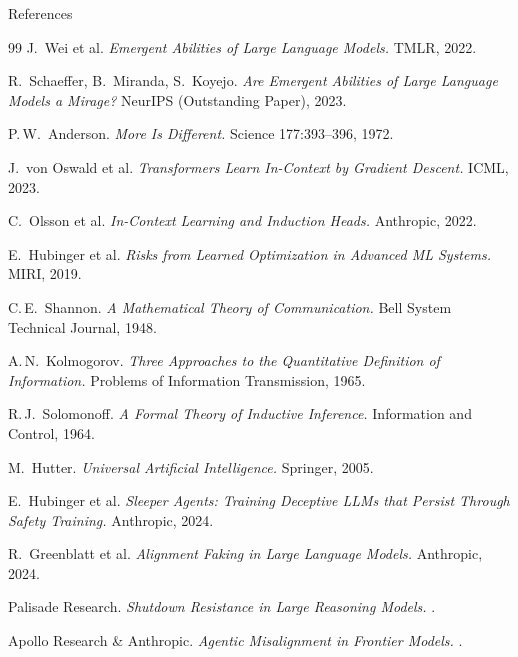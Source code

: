 \documentclass[aspectratio=169, 12pt, xcolor={dvipsnames,table}]{beamer}
\begin{document}
\appendix
\begin{frame}[allowframebreaks]{References}
  \footnotesize
  \begin{thebibliography}{99}
    J.\ Wei et al.
    \newblock \emph{Emergent Abilities of Large Language Models.}
    \newblock TMLR, 2022.

    R.\ Schaeffer, B.\ Miranda, S.\ Koyejo.
    \newblock \emph{Are Emergent Abilities of Large Language Models a Mirage?}
    \newblock NeurIPS (Outstanding Paper), 2023.

    P.\,W.\ Anderson.
    \newblock \emph{More Is Different.}
    \newblock Science 177:393--396, 1972.

    J.\ von Oswald et al.
    \newblock \emph{Transformers Learn In-Context by Gradient Descent.}
    \newblock ICML, 2023.

    C.\ Olsson et al.
    \newblock \emph{In-Context Learning and Induction Heads.}
    \newblock Anthropic, 2022.

    E.\ Hubinger et al.
    \newblock \emph{Risks from Learned Optimization in Advanced ML Systems.}
    \newblock MIRI, 2019.

    C.\,E.\ Shannon.
    \newblock \emph{A Mathematical Theory of Communication.}
    \newblock Bell System Technical Journal, 1948.

    A.\,N.\ Kolmogorov.
    \newblock \emph{Three Approaches to the Quantitative Definition of Information.}
    \newblock Problems of Information Transmission, 1965.

    R.\,J.\ Solomonoff.
    \newblock \emph{A Formal Theory of Inductive Inference.}
    \newblock Information and Control, 1964.

    M.\ Hutter.
    \newblock \emph{Universal Artificial Intelligence.}
    \newblock Springer, 2005.

    E.\ Hubinger et al.
    \newblock \emph{Sleeper Agents: Training Deceptive LLMs that Persist Through Safety Training.}
    \newblock Anthropic, 2024.

    R.\ Greenblatt et al.
    \newblock \emph{Alignment Faking in Large Language Models.}
    \newblock Anthropic, 2024.

    Palisade Research.
    \newblock \emph{Shutdown Resistance in Large Reasoning Models.}
    .

    Apollo Research \& Anthropic.
    \newblock \emph{Agentic Misalignment in Frontier Models.}
    .
  \end{thebibliography}
\end{frame}
\end{document}
